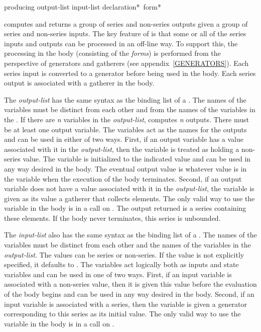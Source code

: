 \begin{defmac}
producing output-list input-list {declaration}* {\,form}*

 computes and returns a group of series and non-series
outputs given a group of series and non-series inputs.  The key feature of
 is that some or all of the series inputs and outputs can be
processed in an off-line way.  To support this, the processing in the
body (consisting of the {\it forms}) is performed from the perspective
of generators and gatherers (see
appendix~\ref{GENERATORS}).  Each series input is converted to a generator
before being used in the body.  Each series output is associated with
a gatherer in the body.

The {\it output-list} has the same syntax as the binding list of a 
.  The names of the variables must be distinct from each other and
from the names of the variables in the .  If there are {\it n}
variables in the {\it output-list},  computes {\it n}
outputs.  There must be at least one output variable.  The variables act as
the names for the outputs and can be used in either of two ways.  First, if
an output variable has a value associated with it in the {\it output-list},
then the variable is treated as holding a non-series value.  The variable
is initialized to the indicated value and can be used in any way desired in
the body. The eventual output value is whatever value is in the variable
when the execution of the body terminates.  Second, if an output variable
does not have a value associated with it in the {\it output-list}, the
variable is given as its value a gatherer that collects elements.  The only
valid way to use the variable in the body is in a call on .
The output returned is a series containing these elements.  If the body
never terminates, this series is unbounded.

The {\it input-list} also has the same syntax as the binding list of a 
.   The names of the variables must be distinct from each other and
the names of the variables in the {\it output-list}.  The values can be
series or non-series.  If the value is not explicitly specified, it
defaults to .  The variables act logically both as inputs and
state variables and can be used in one of two ways.  First, if an input
variable is associated with a non-series value, then it is given this value
before the evaluation of the body begins and can be used in any way desired
in the body.   Second, if an input variable is associated with a series,
then the variable is given a generator corresponding to this series as its
initial value.  The only valid way to use the variable in the body is in a
call on .


\end{defmac}

